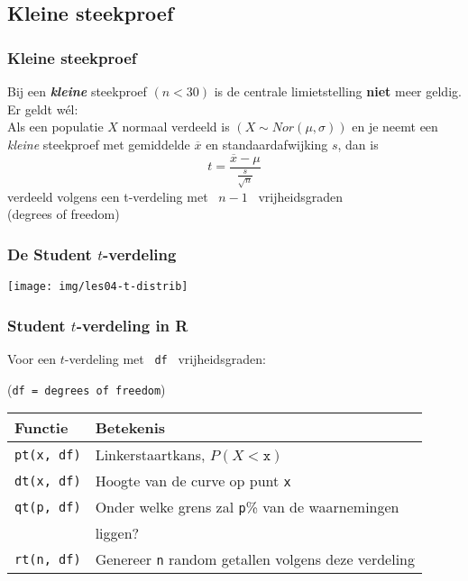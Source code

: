 \documentclass[aspectratio=169]{beamer}
\begin{document}
\subsection{Kleine steekproef}
\begin{frame}
  \frametitle{Kleine steekproef}
  Bij een \textit{\textbf{kleine}} steekproef $(n < 30)$ is de centrale limietstelling \textbf{niet} meer geldig.
  \vfill
  Er geldt wél:\\
  \vfill
  Als een populatie $X$ normaal verdeeld is $(X \sim Nor(\mu,\sigma))$
  en je neemt een \textit{kleine} steekproef met gemiddelde $\overline{x}$ en standaardafwijking $s$,
  dan is
\[ t = \frac{\overline{x} - \mu}{\frac{s}{\sqrt{n}}} \]
verdeeld volgens een t-verdeling met ~$n-1$~ vrijheidsgraden\\
(degrees of freedom)

\end{frame}

\begin{frame}
  \frametitle{De Student $t$-verdeling}
  \bigskip
  \centering
  \texttt{[image: img/les04-t-distrib]}
\end{frame}

\begin{frame}
  \frametitle{Student $t$-verdeling in R}

Voor een $t$-verdeling met ~\texttt{df}~ vrijheidsgraden:

\small (\texttt{df = degrees of freedom})
\vfill
\centering
\begin{tabular}{ll}
	\textbf{Functie}   & \textbf{Betekenis}                                         \\
	\hline
	\texttt{pt(x, df)} & Linkerstaartkans, $P(X<\mathtt{x})$                        \\
	\texttt{dt(x, df)} & Hoogte van de curve op punt \texttt{x}                     \\
	\texttt{qt(p, df)} & Onder welke grens zal \texttt{p}\% van de waarnemingen     \\
	                   & liggen?                                                    \\
	\texttt{rt(n, df)} & Genereer \texttt{n} random getallen volgens deze verdeling
\end{tabular}

\end{frame}
\end{document}
